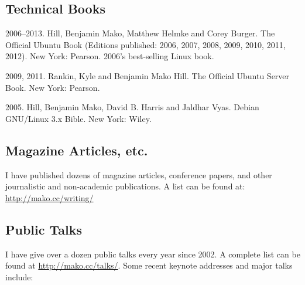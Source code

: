 \documentclass[10pt]{article}
\newenvironment{cvlist}{
\begin{list}{}{\leftmargin=3.0em \itemindent=-3.0em}
  \setlength{\itemsep}{0pt}
  \setlength{\parskip}{0em}
  \setlength{\parsep}{1em}
  \setlength{\parindent}{0em}}
{\vspace{1em}
\end{list}}
\begin{document}
\subsection{Technical Books}
\begin{cvlist}
\item 2006--2013. Hill, Benjamin Mako, Matthew Helmke and Corey Burger. The Official Ubuntu Book (Editions published: 2006, 2007, 2008, 2009, 2010, 2011, 2012). New York: Pearson. 2006's best-selling Linux book.
\item 2009, 2011. Rankin, Kyle and Benjamin Mako Hill. The Official Ubuntu Server Book. New York: Pearson.
\item 2005. Hill, Benjamin Mako, David B. Harris and Jaldhar Vyas. Debian GNU/Linux 3.x Bible. New York: Wiley.
\end{cvlist}

\subsection{Magazine Articles, etc.}

I have published dozens of magazine articles, conference papers, and other journalistic and non-academic publications. A list can be found at: \url{http://mako.cc/writing/}

\vspace{2.5em}

\subsection{Public Talks}

I have give over a dozen public talks every year since 2002. A complete list can be found at \url{http://mako.cc/talks/}. Some recent keynote addresses and major talks include:
\end{document}
